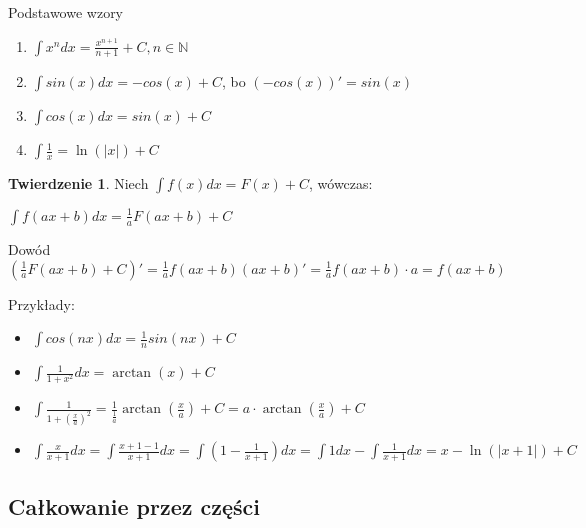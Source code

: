 \documentclass{article}
\theoremstyle{definition}
\theoremstyle{definition}
\newtheorem{tw}{Twierdzenie}[subsection]
\theoremstyle{definition}
\theoremstyle{definition}
\begin{document}
Podstawowe wzory
\begin{enumerate}
    \item $\int x^n dx = \frac{x^{n+1}}{n+1} + C, n\in \mathbb{N}$
    \item $\int sin(x) dx = - cos(x) + C$, bo $(-cos(x))'=sin(x)$
    \item $\int cos(x) dx = sin (x) + C$
    \item $\int \frac{1}{x} = \ln(|x|) + C$
\end{enumerate}

\begin{tw}
    Niech $\int f(x) dx = F(x) + C$, wówczas:
    \begin{center}
        $\int f(ax+b) dx = \frac{1}{a}F(ax+b)+C$
    \end{center}
    Dowód\\
    $\left(\frac{1}{a}F(ax+b)+C\right)'=\frac{1}{a} f(ax+b) (ax+b)' = \frac{1}{a} f(ax+b)\cdot a = f(ax+b)$
\end{tw}
Przykłady:
\begin{itemize}
    \item $\int cos(nx) dx = \frac{1}{n} sin(nx) + C$
    \item $\int \frac{1}{1+x^2} dx = \arctan(x) + C$
    \item $\int \frac{1}{1+(\frac{x}{a})^2} = \frac{1}{\frac{1}{a}} \arctan(\frac{x}{a}) + C = a\cdot \arctan(\frac{x}{a}) + C$
    \item $\int \frac{x}{x+1} dx = \int \frac{x+1-1}{x+1} dx = \int (1-\frac{1}{x+1}) dx = \int 1 dx - \int \frac{1}{x+1} dx = x - \ln(|x+1|) + C$
\end{itemize}

\subsection{Całkowanie przez części}
\end{document}
